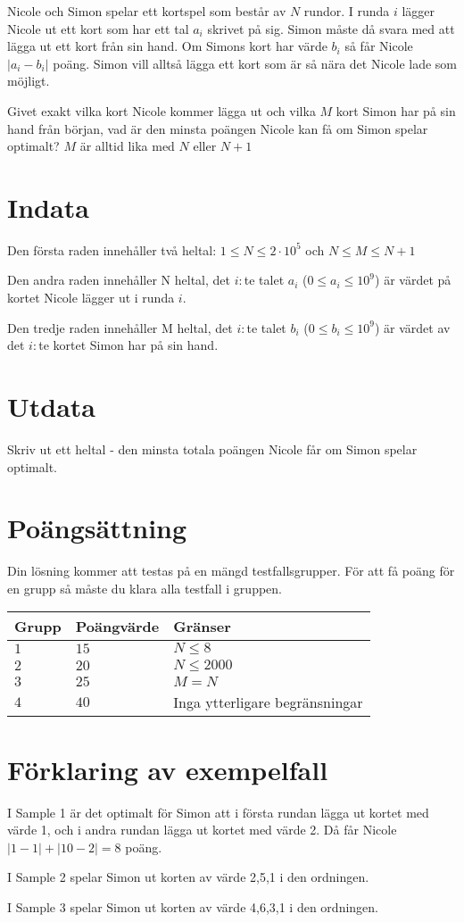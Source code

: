 Nicole och Simon spelar ett kortspel som består av $N$ rundor. I runda $i$ lägger Nicole ut ett kort som har ett tal $a_i$ skrivet på sig. Simon måste då svara med att lägga ut ett kort från sin hand. Om Simons kort har värde $b_i$ så får Nicole $|a_i-b_i|$ poäng. Simon vill alltså lägga ett kort som är så nära det Nicole lade som möjligt.

Givet exakt vilka kort Nicole kommer lägga ut och vilka $M$ kort Simon har på sin hand från början, vad är den minsta poängen Nicole kan få om Simon spelar optimalt? $M$ är alltid lika med $N$ eller $N+1$

\section*{Indata}
Den första raden innehåller två heltal: $1\leq N \leq 2 \cdot 10^5$ och $N\leq M \leq N+1$

Den andra raden innehåller N heltal, det $i:$te talet $a_i$ ($0\le a_i \le 10^9$) är värdet på kortet Nicole lägger ut i runda $i$.

Den tredje raden innehåller M heltal, det $i:$te talet $b_i$ ($0\le b_i \le 10^9$) är värdet av det $i:$te kortet Simon har på sin hand.

\section*{Utdata}
Skriv ut ett heltal - den minsta totala poängen Nicole får om Simon spelar optimalt.

\section*{Poängsättning}
Din lösning kommer att testas på en mängd testfallsgrupper.
För att få poäng för en grupp så måste du klara alla testfall i gruppen.

\noindent
\begin{tabular}{| l | l | p{12cm} |}
  \hline
  Grupp & Poängvärde & Gränser \\ \hline
  $1$   & $15$       & $N \leq 8 $\\ \hline
  $2$   & $20$       & $N \leq 2000 $  \\ \hline
  $3$   & $25$       & $M=N$ \\ \hline
  $4$   & $40$       & Inga ytterligare begränsningar \\ \hline
\end{tabular}

\section*{Förklaring av exempelfall}
I Sample 1 är det optimalt för Simon att i första rundan lägga ut kortet med värde 1, och i andra rundan lägga ut kortet med värde 2. Då får Nicole $|1-1| + |10-2|=8$ poäng.

I Sample 2 spelar Simon ut korten av värde 2,5,1 i den ordningen.

I Sample 3 spelar Simon ut korten av värde 4,6,3,1 i den ordningen.